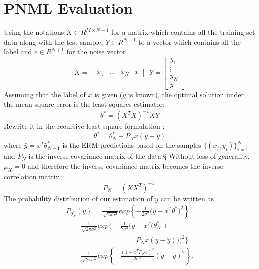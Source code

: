 \documentclass[conference,letterpaper]{IEEEtran}
\begin{document}
\section{PNML Evaluation} \label{sec:pNML_eval}
Using the notations $X \in R^{M \times N+1}$ for a matrix which contains all the training set data along with the test sample, $Y \in R^{N+1}$ to a vector which contains all the label and $e \in R^{N+1}$ for the noise vector
\begin{equation}
X = \begin{bmatrix} x_1 & \dots & x_N & x \end{bmatrix}\ \ 
Y = \begin{bmatrix} y_1 \\ \vdots \\ y_N \\ y \end{bmatrix}
\end{equation}
Assuming that the label of $x$ is given ($y$ is known), the optimal solution under the mean square error is the least squares estimator:
\begin{equation}
\theta ^* = (X^T X)^{-1} X Y
\end{equation}
Rewrite it in the recursive least square formulation \cite{hayes19969}:
\begin{equation} \label{eq:rls_update}
\theta ^* = \theta^*_{N} - P_N x (y - \hat{y})
\end{equation}
where $\hat{y} = x^T \theta ^*_{N-1}$ is the ERM predictions based on the samples $\{(x_i, y_i)\}_{i=1}^{N}$ and $P_N$ is the inverse covariance matrix of the data.§
Without loss of generality, $\mu _{X} = 0$ and therefore the inverse covariance matrix becomes the inverse correlation matrix
\begin{equation}
P_N = (XX^T)^{-1}. 
\end{equation}
The probability distribution of our estimation of $y$ can be written as
\begin{equation}
\begin{split}
&P_{\theta_N ^*}(y) 
=\frac{1}{\sqrt[]{2\pi\sigma^2}}exp\left\{-\frac{1}{2\sigma^2}\big(y- x^T\theta ^* \big)^2\right\} = \\
& \qquad \frac{1}{\sqrt[]{2\pi\sigma^2}}exp\bigg\{-\frac{1}{2\sigma^2}\big(y - x^T \big(\theta^*_{N} + \\ 
& \qquad \qquad \qquad \qquad \qquad P_N x (y -\hat{y}) \big) \big)^2\bigg\} = \\
& \qquad \frac{1}{\sqrt[]{2\pi\sigma^2}}
exp\left\{-\frac{(1 - x^T P_N x )^2 }{2\sigma^2}\left(y-\hat{y} \right)^2\right\}.  \\
\end{split}
\end{equation}
\end{document}
